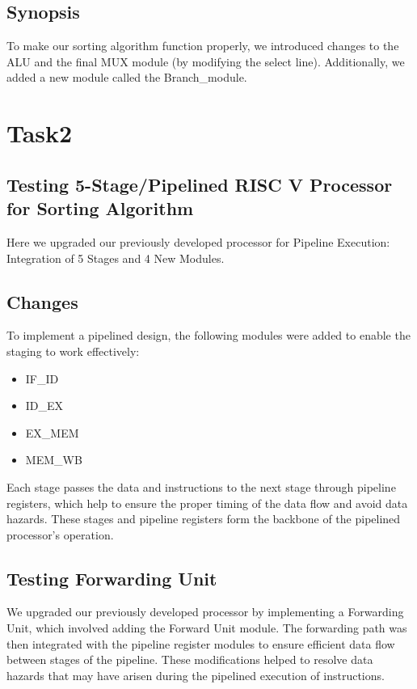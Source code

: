 \documentclass{report}
\theoremstyle{mytheoremstyle}
\theoremstyle{mytheoremstyle}
\theoremstyle{myproblemstyle}
\begin{document}
\subsection{Synopsis}
    To make our sorting algorithm function properly, we introduced changes to the ALU and the final MUX module (by modifying the select line). Additionally, we added a new module called the Branch\_module.
\newpage
\section{Task2}
\subsection{Testing 5-Stage/Pipelined RISC V Processor for Sorting Algorithm}

Here we upgraded our previously developed processor for Pipeline Execution: Integration of 5 Stages and 4 New Modules.

\subsection{Changes}

To implement a pipelined design, the following modules were added to enable the staging to work effectively:
\begin{itemize}
\item IF\_ID
\item ID\_EX
\item EX\_MEM
\item MEM\_WB
\end{itemize}

Each stage passes the data and instructions to the next stage through pipeline registers, which help to ensure the proper timing of the data flow and avoid data hazards. These stages and pipeline registers form the backbone of the pipelined processor's operation.

\subsection{Testing Forwarding Unit}

We upgraded our previously developed processor by implementing a Forwarding Unit, which involved adding the Forward Unit module. The forwarding path was then integrated with the pipeline register modules to ensure efficient data flow between stages of the pipeline. These modifications helped to resolve data hazards that may have arisen during the pipelined execution of instructions.
\pagebreak
\end{document}
